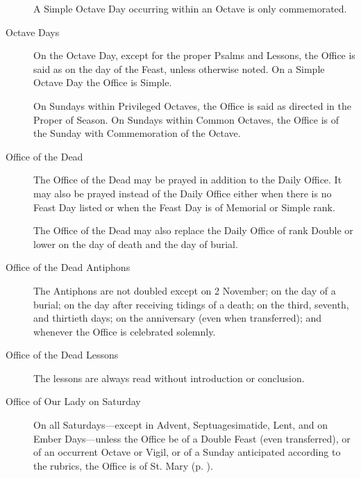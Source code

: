 \begin{description}
A Simple Octave Day occurring within an Octave is only commemorated.
\item[Octave Days] On the Octave Day, except for the proper Psalms and Lessons, the Office is said as on the day of the Feast, unless otherwise noted. On a Simple Octave Day the Office is Simple.
\par
On Sundays within Privileged Octaves, the Office is said as directed in the Proper of Season. On Sundays within Common Octaves, the Office is of the Sunday with Commemoration of the Octave.
\item[Office of the Dead] The Office of the Dead may be prayed in addition to the Daily Office. It may also be prayed instead of the Daily Office either when there is no Feast Day listed or when the Feast Day is of Memorial or Simple rank.\par
The Office of the Dead may also replace the Daily Office of rank Double or lower on the day of death and the day of burial.
\item[Office of the Dead Antiphons] The Antiphons are not doubled except on 2 November; %
on the day of a burial; on the day after receiving tidings of a death; on the third, seventh, and thirtieth days; on the anniversary (even when transferred); and whenever the Office is celebrated solemnly.
\item[Office of the Dead Lessons] The lessons are always read without introduction or conclusion.
\item[Office of Our Lady on Saturday] On all Saturdays---except in Advent, Septuagesimatide, Lent, and on Ember Days---unless the Office be of a Double Feast (even transferred), or of an occurrent Octave or Vigil, or of a Sunday anticipated according to the rubrics, the Office is of St. Mary (p. \pageref{MarySaturday}).

\end{description}
